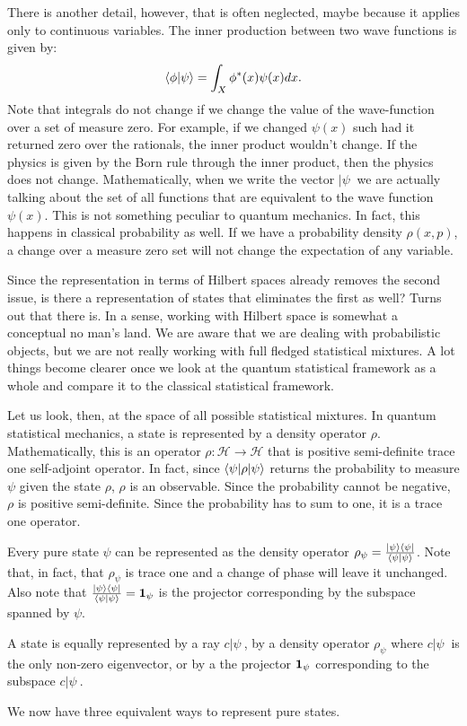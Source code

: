 There is another detail, however, that is often neglected, maybe because it applies only to continuous variables. The inner production between two wave functions is given by:
\begin{equation}
	\< \phi | \psi \> = \int_X \phi^*(x) \psi(x) dx.
\end{equation}
Note that integrals do not change if we change the value of the wave-function over a set of measure zero. For example, if we changed $\psi(x)$ such had it returned zero over the rationals, the inner product wouldn't change. If the physics is given by the Born rule through the inner product, then the physics does not change. Mathematically, when we write the vector $|\psi \>$ we are actually talking about the set of all functions that are equivalent to the wave function $\psi(x)$. This is not something peculiar to quantum mechanics. In fact, this happens in classical probability as well. If we have a probability density $\rho(x,p)$, a change over a measure zero set will not change the expectation of any variable.

Since the representation in terms of Hilbert spaces already removes the second issue, is there a representation of states that eliminates the first as well? Turns out that there is. In a sense, working with Hilbert space is somewhat a conceptual no man's land. We are aware that we are dealing with probabilistic objects, but we are not really working with full fledged statistical mixtures. A lot things become clearer once we look at the quantum statistical framework as a whole and compare it to the classical statistical framework.

Let us look, then, at the space of all possible statistical mixtures. In quantum statistical mechanics, a state is represented by a density operator $\rho$. Mathematically, this is an operator $\rho : \mathcal{H} \to \mathcal{H}$ that is positive semi-definite trace one self-adjoint operator. In fact, since $\< \psi | \rho | \psi \>$ returns the probability to measure $\psi$ given the state $\rho$, $\rho$ is an observable. Since the probability cannot be negative, $\rho$ is positive semi-definite. Since the probability has to sum to one, it is a trace one operator.

Every pure state $\psi$ can be represented as the density operator $\rho_{\psi} = \frac{| \psi \> \< \psi |}{\< \psi | \psi \>}$. Note that, in fact, that $\rho_{\psi}$ is trace one and a change of phase will leave it unchanged. Also note that $\frac{| \psi \> \< \psi |}{\< \psi | \psi \>} = \indicator[\psi]$ is the projector corresponding by the subspace spanned by $\psi$.
\begin{insight}
	A state is equally represented by a ray $c|\psi\>$, by a density operator $\rho_{\psi}$ where $c|\psi\>$ is the only non-zero eigenvector, or by a the projector $\indicator[\psi]$ corresponding to the subspace $c|\psi\>$.
\end{insight}
We now have three equivalent ways to represent pure states.

